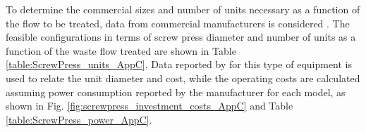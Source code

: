 \begin{refsection}[referencesCh4]
To determine the commercial sizes and number of units necessary as a function of the flow to be treated, data from commercial manufacturers is considered \citep{PWTech}. The feasible configurations in terms of screw press diameter and number of units as a function of the waste flow treated are shown in Table \ref{table:ScrewPress_units_AppC}. Data reported by \citet{Matches} for this type of equipment is used to relate the unit diameter and cost, while the operating costs are calculated assuming power consumption reported by the manufacturer for each model, as shown in Fig. \ref{fig:screwpress_investment_costs_AppC} and Table \ref{table:ScrewPress_power_AppC}.
\begin{table}[h] 
		\centering
		\caption{Sizing estimated for screw press units based commercial on data \protect\citep{PWTech}} \label{table:ScrewPress_units_AppC}
\end{table}


\end{refsection}
